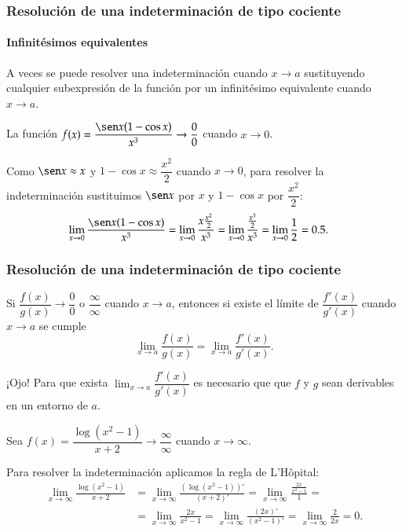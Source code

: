 \begin{frame}
\frametitle{Resolución de una indeterminación de tipo cociente}
\framesubtitle{Infinitésimos equivalentes}
A veces se puede resolver una indeterminación cuando $x\rightarrow a$ sustituyendo cualquier subexpresión de la función por un infinitésimo equivalente cuando $x\rightarrow a$.

 La función $f(x)=\dfrac{\sen x(1- \cos x)}{x^3}\rightarrow \dfrac{0}{0}$ cuando $x\rightarrow 0$.

Como $\sen x \approx x$ y $1-\cos x\approx \dfrac{x^2}{2}$ cuando $x\rightarrow 0$, para resolver la indeterminación sustituimos $\sen x$ por $x$ y $1-\cos x$ por $\dfrac{x^2}{2}$:
\begin{align*}
\lim_{x\rightarrow 0}\frac{\sen x(1- \cos x)}{x^3}&=
\lim_{x\rightarrow 0}\dfrac{x\frac{x^2}{2}}{x^3} =
\lim_{x\rightarrow 0}\dfrac{\frac{x^3}{2}}{x^3} = \lim_{x\rightarrow 0}\dfrac{1}{2} =0.5.
\end{align*}
\end{frame}


\begin{frame}
\frametitle{Resolución de una indeterminación de tipo cociente}
\begin{teorema}
Si $\dfrac{f(x)}{g(x)}\rightarrow \dfrac{0}{0}$ o $\dfrac{\infty}{\infty}$ cuando $x\rightarrow a$, entonces si existe el límite de $\dfrac{f'(x)}{g'(x)}$ cuando $x\rightarrow a$ se cumple
\[
\lim_{x\rightarrow a}\frac{f(x)}{g(x)}=\lim_{x\rightarrow a}\frac{f'(x)}{g'(x)}.
\]
\end{teorema}

\alert{¡Ojo!} Para que exista $\lim_{x\rightarrow a}\dfrac{f'(x)}{g'(x)}$ es necesario que que $f$ y $g$ sean derivables en un entorno de $a$.

 Sea $f(x)=\dfrac{\log(x^2-1)}{x+2}\rightarrow \dfrac{\infty}{\infty}$ cuando $x\rightarrow \infty$.

Para resolver la indeterminación aplicamos la regla de L'Hôpital:
\begin{align*}
\lim_{x\rightarrow \infty}\frac{\log(x^2-1)}{x+2} &= \lim_{x\rightarrow
\infty}\frac{\left(\log(x^2-1)\right)'}{\left(x+2\right)'}= \lim_{x\rightarrow \infty}\frac{\frac{2x}{x^2-1}}{1}=\\
&=\lim_{x\rightarrow \infty}\frac{2x}{x^2-1}= \lim_{x\rightarrow \infty}\frac{\left(2x\right)'}{\left(x^2-1\right)'}=
\lim_{x\rightarrow \infty}\frac{2}{2x}=0.
\end{align*}
\end{frame}



